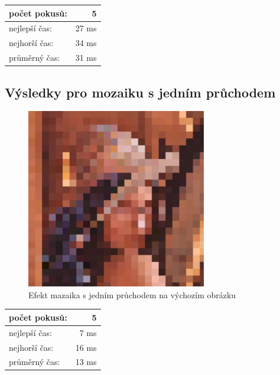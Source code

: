 \documentclass[12pt]{scrartcl}
\begin{document}
\begin{center}
  \begin{tabular}{ | l | r | }
    \hline
    počet pokusů: & 5 \\ \hline
    nejlepší čas: & 27 ms \\ \hline
    nejhorší čas: & 34 ms \\ \hline
    průměrný čas: & 31 ms \\
    \hline
  \end{tabular}
\end{center}

\newpage
\subsection{Výsledky pro mozaiku s jedním průchodem}

\begin{figure}[!ht]
	\centering
	\label{obr:mosaic}
	\includegraphics[width=0.7\textwidth,natwidth=1,natheight=1]{mosaic_simple.pdf}
	\caption{Efekt mazaika s jedním průchodem na výchozím obrázku}
\end{figure}	

\begin{center}
  \begin{tabular}{ | l | r | }
    \hline
    počet pokusů: & 5 \\ \hline
    nejlepší čas: & 7 ms \\ \hline
    nejhorší čas: & 16 ms \\ \hline
    průměrný čas: & 13 ms \\
    \hline
  \end{tabular}
\end{center}
\end{document}
